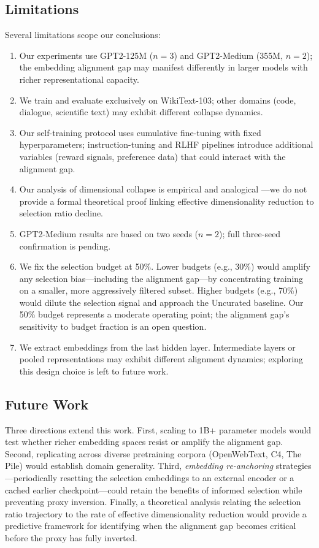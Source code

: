 \subsection{Limitations}

Several limitations scope our conclusions:
\begin{enumerate}
    \item Our experiments use GPT2-125M ($n{=}3$) and GPT2-Medium (355M, $n{=}2$); the embedding alignment gap may manifest differently in larger models with richer representational capacity.
    \item We train and evaluate exclusively on WikiText-103; other domains (code, dialogue, scientific text) may exhibit different collapse dynamics.
    \item Our self-training protocol uses cumulative fine-tuning with fixed hyperparameters; instruction-tuning and RLHF pipelines introduce additional variables (reward signals, preference data) that could interact with the alignment gap.
    \item Our analysis of dimensional collapse is empirical and analogical \citep{jing2022understanding}---we do not provide a formal theoretical proof linking effective dimensionality reduction to selection ratio decline.
    \item GPT2-Medium results are based on two seeds ($n{=}2$); full three-seed confirmation is pending.
    \item We fix the selection budget at 50\%. Lower budgets (e.g., 30\%) would amplify any selection bias---including the alignment gap---by concentrating training on a smaller, more aggressively filtered subset. Higher budgets (e.g., 70\%) would dilute the selection signal and approach the Uncurated baseline. Our 50\% budget represents a moderate operating point; the alignment gap's sensitivity to budget fraction is an open question.
    \item We extract embeddings from the last hidden layer. Intermediate layers or pooled representations may exhibit different alignment dynamics; exploring this design choice is left to future work.
\end{enumerate}

\subsection{Future Work}

Three directions extend this work. First, scaling to 1B+ parameter models would test whether richer embedding spaces resist or amplify the alignment gap. Second, replicating across diverse pretraining corpora (OpenWebText, C4, The Pile) would establish domain generality. Third, \emph{embedding re-anchoring} strategies---periodically resetting the selection embeddings to an external encoder or a cached earlier checkpoint---could retain the benefits of informed selection while preventing proxy inversion. Finally, a theoretical analysis relating the selection ratio trajectory to the rate of effective dimensionality reduction would provide a predictive framework for identifying when the alignment gap becomes critical before the proxy has fully inverted.
